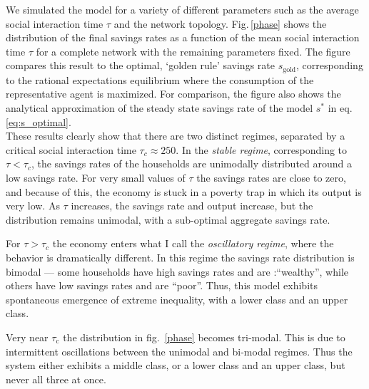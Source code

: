 We simulated the model for a variety of different parameters such as the average social interaction time $\tau$ and the network topology. Fig.\,\ref{phase} shows the distribution of the final savings rates as a function of the mean social interaction time $\tau$ for a complete network with the remaining parameters fixed.  The figure compares this result to the optimal, `golden rule' savings rate $s_\mathrm{gold}$,  corresponding to the rational expectations equilibrium where the consumption of the representative agent is maximized. For comparison, the figure also shows the analytical approximation of the steady state savings rate of the model $s^*$ in eq. \eqref{eq:s_optimal}.\\

These results clearly show that there are two distinct regimes, separated by a critical social interaction time $\tau_{c} \approx 250$.
In the \emph{stable regime}, corresponding to $\tau < \tau_{c}$, the savings rates of the households are unimodally distributed around a low savings rate.  For very small values of $\tau$ the savings rates are close to zero, and because of this, the economy is stuck in a poverty trap in which its output is very low.  As $\tau$ increases, the savings rate and output increase, but the distribution remains unimodal, with a sub-optimal aggregate savings rate.

For $\tau \! > \! \tau_{c}$ the economy enters what I call the \emph{ oscillatory regime}, where the behavior is dramatically different. In this regime the savings rate distribution is bimodal --- some households have high savings rates and are :``wealthy'', while others have low savings rates and are ``poor''.  Thus, this model exhibits spontaneous emergence of extreme inequality, with a lower class and an upper class.

Very near $\tau_\mathrm{c}$ the distribution in fig.~\ref{phase} becomes tri-modal. This is due to intermittent oscillations between the unimodal and bi-modal regimes. Thus the system either exhibits a middle class, or a lower class and an upper class, but never all three at once.

